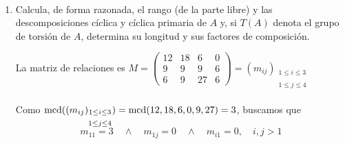 \documentclass[12pt]{article}
\begin{document}
    \begin{ejercicio}~
        \begin{enumerate}[label=(\alph*)]
            \item Calcula, de forma razonada, el rango (de la parte libre) y las descomposiciones cíclica y cíclica primaria de $A$ y, si $T(A)$ denota el grupo de torsión de $A$, determina su longitud y sus factores de composición.
            
            La matriz de relaciones es 
            $M = \begin{pmatrix}
                12 & 18 & 6 & 0 \\
                9 & 9 & 9 & 6 \\
                6 & 9 & 27 & 6
            \end{pmatrix} = (m_{ij})_{\substack{1\le i\le 3 \\\\ 1\le j\le 4}}$ \\\\
            Como $\operatorname{mcd}((m_{ij})_{\substack{1\le i\le 3 \\\\ 1\le j\le 4}}) = \operatorname{mcd}(12,18,6,0,9,27) = 3 $, buscamos que $$m_{11} = 3 \quad \land \quad m_{1j} = 0 \quad \land \quad m_{i1} = 0, \quad i,j>1$$


\end{enumerate}
\end{ejercicio}
\end{document}
